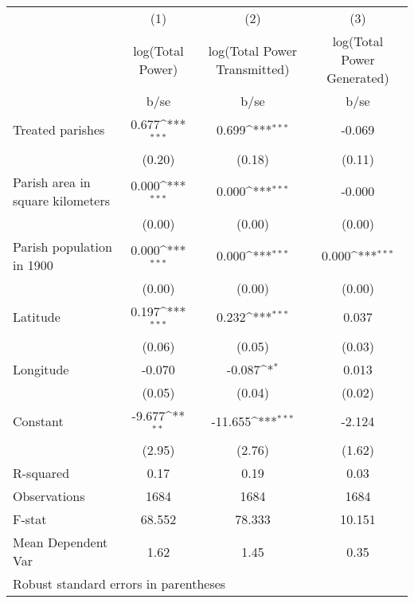 {
\def\sym#1{\ifmmode^{#1}\else\(^{#1}\)\fi}
\begin{tabular}{l*{3}{c}}
\hline\hline
                    &\multicolumn{1}{c}{(1)}         &\multicolumn{1}{c}{(2)}         &\multicolumn{1}{c}{(3)}         \\
                    &log(Total Power)         &log(Total Power Transmitted)         &log(Total Power Generated)         \\
                    &        b/se         &        b/se         &        b/se         \\
\hline
Treated parishes    &       0.677\sym{***}&       0.699\sym{***}&      -0.069         \\
                    &      (0.20)         &      (0.18)         &      (0.11)         \\
Parish area in square kilometers&       0.000\sym{***}&       0.000\sym{***}&      -0.000         \\
                    &      (0.00)         &      (0.00)         &      (0.00)         \\
Parish population in 1900&       0.000\sym{***}&       0.000\sym{***}&       0.000\sym{***}\\
                    &      (0.00)         &      (0.00)         &      (0.00)         \\
Latitude            &       0.197\sym{***}&       0.232\sym{***}&       0.037         \\
                    &      (0.06)         &      (0.05)         &      (0.03)         \\
Longitude           &      -0.070         &      -0.087\sym{*}  &       0.013         \\
                    &      (0.05)         &      (0.04)         &      (0.02)         \\
Constant            &      -9.677\sym{**} &     -11.655\sym{***}&      -2.124         \\
                    &      (2.95)         &      (2.76)         &      (1.62)         \\
\hline
R-squared           &        0.17         &        0.19         &        0.03         \\
Observations        &        1684         &        1684         &        1684         \\
F-stat              &      68.552         &      78.333         &      10.151         \\
Mean Dependent Var  &        1.62         &        1.45         &        0.35         \\
\hline\hline
\multicolumn{4}{l}{\footnotesize Robust standard errors in parentheses}\\
\end{tabular}
}
